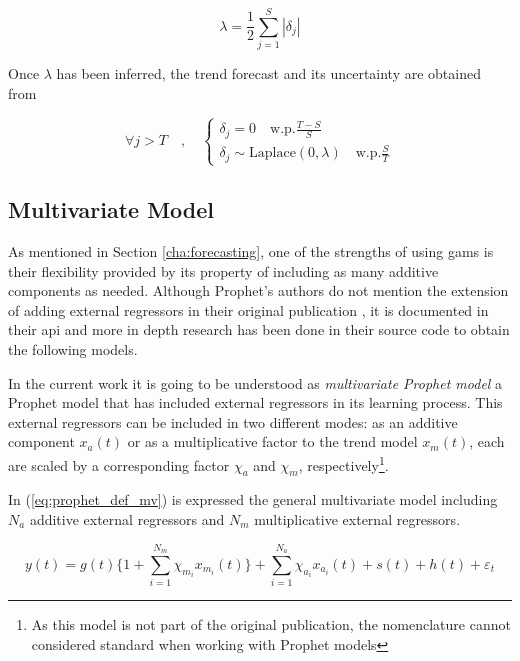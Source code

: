 \begin{equation}\label{eq:lambda_inferr}
	\lambda = \frac{1}{2} \sum_{j=1}^{S}{|\delta_j|}
\end{equation}

Once $\lambda$ has been inferred, the trend forecast and its uncertainty are obtained from

\begin{equation}\label{eq:trend_forecast}
	\forall j > T\quad,\quad 
	\begin{cases}
		\delta_j = 0 \quad \text{w.p.} \frac{T-S}{S} \\
		\delta_j \sim \text{Laplace}(0,\lambda) \quad \text{w.p.} \frac{S}{T}
	\end{cases}
\end{equation}


\subsection{Multivariate Model}
\label{sec:mv_prophet}

As mentioned in Section \ref{cha:forecasting}, one of the strengths of using \acp{gam} is their flexibility provided by its property of including as many additive components as needed. Although Prophet's authors do not mention the extension of adding external regressors in their original publication \cite{fb_prophet}, it is documented in their \ac{api} and more in depth research has been done in their source code to obtain the following models.

In the current work it is going to be understood as \emph{multivariate Prophet model} a Prophet model that has included external regressors in its learning process. This external regressors can be included in two different modes: as an additive component $x_a(t)$ or as a multiplicative factor to the trend model $x_m(t)$, each are scaled by a corresponding factor $\chi_a$ and $\chi_m$, respectively\footnote{As this model is not part of the original publication, the nomenclature cannot considered standard when working with Prophet models}.

In (\ref{eq:prophet_def_mv}) is expressed the general multivariate model including $N_a$ additive external regressors and $N_m$ multiplicative external regressors.

\begin{equation}
	\label{eq:prophet_def_mv}
	y(t) = g(t) \bigg\{ 1 + \sum_{i=1}^{N_m}{\chi_{m_i} x_{m_i}(t)} \bigg\} + \sum_{i=1}^{N_a}{\chi_{a_i} x_{a_i}(t)} + s(t) + h(t) + \varepsilon_t
\end{equation}

